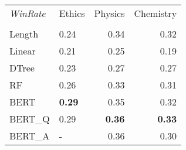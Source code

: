 \begin{tabular}{llrr}
\toprule
\textit{WinRate} & Ethics &  Physics &  Chemistry \\
		  &        &          &            \\
\midrule
Length &   0.24 &     			0.34 &       			0.32 \\
Linear &   0.21 &     			0.25 &       			0.19 \\
DTree  &   0.23 &     			0.27 &       			0.27 \\
RF     &   0.26 &     			0.33 &       			0.31 \\
BERT   &   \textbf{0.29} &     0.35 &       			0.32 \\
BERT\_Q &   0.29 &     		\textbf{0.36} &       \textbf{0.33} \\
BERT\_A &      - &     			0.36 &       		0.30 \\
\bottomrule
\end{tabular}
